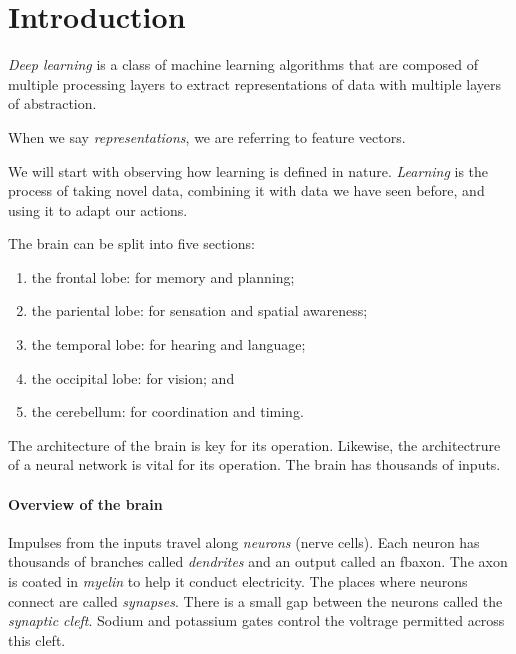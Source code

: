 
\section{Introduction}

\begin{definition}
	\emph{Deep learning} is a class of machine learning algorithms that are 
	composed of multiple processing layers to extract representations of data 
	with multiple layers of abstraction.
\end{definition}

\begin{remark}
	When we say \emph{representations}, we are referring to feature vectors.
\end{remark}

We will start with observing how learning is defined in nature.
\emph{Learning} is the process of taking novel data, combining it with data we 
have seen before, and using it to adapt our actions.

The brain can be split into five sections:
\begin{enumerate}
	\item the frontal lobe: for memory and planning;
	\item the pariental lobe: for sensation and spatial awareness;
	\item the temporal lobe: for hearing and language;
	\item the occipital lobe: for vision; and
	\item the cerebellum: for coordination and timing.
\end{enumerate}

The architecture of the brain is key for its operation.
Likewise, the architectrure of a neural network is vital for its operation.
The brain has thousands of inputs. 

\paragraph{Overview of the brain}
Impulses from the inputs travel along
\emph{neurons} (nerve cells). Each neuron has thousands of branches called
\emph{dendrites} and an output called an fbaxon.
The axon is coated in \emph{myelin} to help it conduct electricity.
The places where neurons connect are called \emph{synapses}.
There is a small gap between the neurons called the \emph{synaptic cleft}.
Sodium and potassium gates control the voltrage permitted across this cleft.

